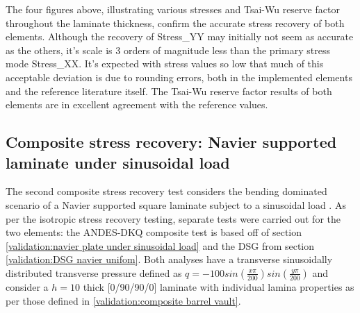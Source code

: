 The four figures above, illustrating various stresses and Tsai-Wu reserve factor throughout the laminate thickness, confirm the accurate stress recovery of both elements. Although the recovery of Stress\_YY may initially not seem as accurate as the others, it's scale is 3 orders of magnitude less than the primary stress mode Stress\_XX. It's expected with stress values so low that much of this acceptable deviation is due to rounding errors, both in the implemented elements and the reference literature itself. The Tsai-Wu reserve factor results of both elements are in excellent agreement with the reference values.

\subsection{Composite stress recovery: Navier supported laminate under sinusoidal load}
The second composite stress recovery test considers the bending dominated scenario of a Navier supported square laminate subject to a sinusoidal load \cite{reddy2004mechanics}. As per the isotropic stress recovery testing, separate tests were carried out for the two elements: the ANDES-DKQ composite test is based off of section \ref{validation:navier plate under sinusoidal load} and the DSG from section \ref{validation:DSG navier unifom}. Both analyses have a transverse sinusoidally distributed transverse pressure defined as $q = -100 sin(\frac{x\pi}{200})sin(\frac{y\pi}{200})$ and consider a $h = 10$ thick [0/90/90/0] laminate with individual lamina properties as per those defined in \ref{validation:composite barrel vault}.

